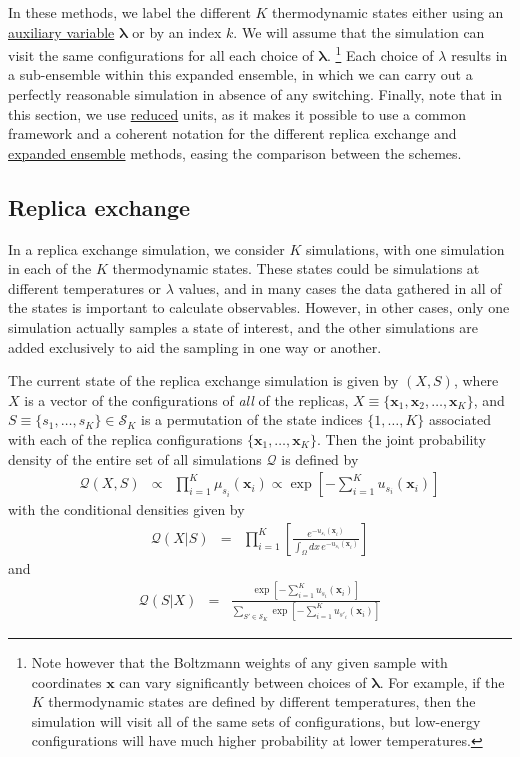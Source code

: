 \documentclass[9pt,review]{livecoms}
\newcommand{\vx}{\mathbf{x}}
\begin{document}
In these methods, we label the different $K$ thermodynamic states either using an \hyperlink{ref:AuxVar} {auxiliary variable} $\mathbf{\lambda}$  or by an index $k$. We will assume that the simulation can visit the same configurations for all each choice of $\mathbf{\lambda}$. \footnote{Note however that the Boltzmann weights of any given sample with coordinates $\vx$ can vary significantly between choices of $\mathbf{\lambda}$. For example, if the $K$ thermodynamic states are defined by different temperatures, then the simulation will visit all of the same sets of configurations, but low-energy configurations will have much higher probability at lower temperatures.} Each choice of $\lambda$ results in a sub-ensemble within this expanded ensemble, in which we can carry out a perfectly reasonable simulation in absence of any switching. Finally, note that in this section, we use \hyperlink{ref:reduced} {reduced} units, as it makes it possible to use a common framework and a coherent notation for the different replica exchange and \hyperlink{ref:ExpEns} {expanded ensemble} methods, easing the comparison between the schemes.

\subsection{Replica exchange}
\label{sec:ReplicaExchange}
In a replica exchange simulation, we consider $K$ simulations, with one simulation in each of the $K$ thermodynamic states.  These states could be simulations at different temperatures or $\lambda$ values, and in many cases the data gathered in all of the states is important to calculate observables. However, in other cases, only one simulation actually samples a state of interest, and the other simulations are added exclusively to aid the sampling in one way or another.

The current state of the replica exchange simulation is given by $(X,S)$, where $X$ is a vector of the configurations of \emph{all} of the replicas, $X \equiv \{\vx_1, \vx_2, \ldots, \vx_K\}$, and $S \equiv\{s_1,\ldots,s_K\} \in \mathcal{S}_K$ is a permutation of the state indices $\{1, \ldots, K\}$ associated with each of the replica configurations $\{\vx_1, \ldots, \vx_K\}$. Then the joint probability density of the entire set of all simulations $\mathcal{Q}$ is defined by
\begin{eqnarray}
\mathcal{Q}(X, S) &\propto& \prod_{i=1}^{K} \mu_{s_i}(\vx_i) \propto \exp\left[-\sum_{i=1}^K u_{s_i}(\vx_i)\right]
\label{eq:parallereplica}
\end{eqnarray}
with the conditional densities given by
\begin{eqnarray}
\mathcal{Q}(X | S) &=& \prod_{i=1}^K \left[ \frac{e^{-u_{s_i}(\vx_i)}}{\int_\Omega dx \, e^{-u_{s_i}(\vx_i)}}\right]
\end{eqnarray}
and
\begin{eqnarray}
\mathcal{Q}(S | X) &=& \frac{\exp\left[- \sum\limits_{i=1}^K u_{s_i}(\vx_i) \right]}{\sum\limits_{S' \in \mathcal{S}_K} \exp\left[- \sum\limits_{i=1}^K u_{s'_i}(\vx_i) \right]}
\end{eqnarray}
\end{document}
